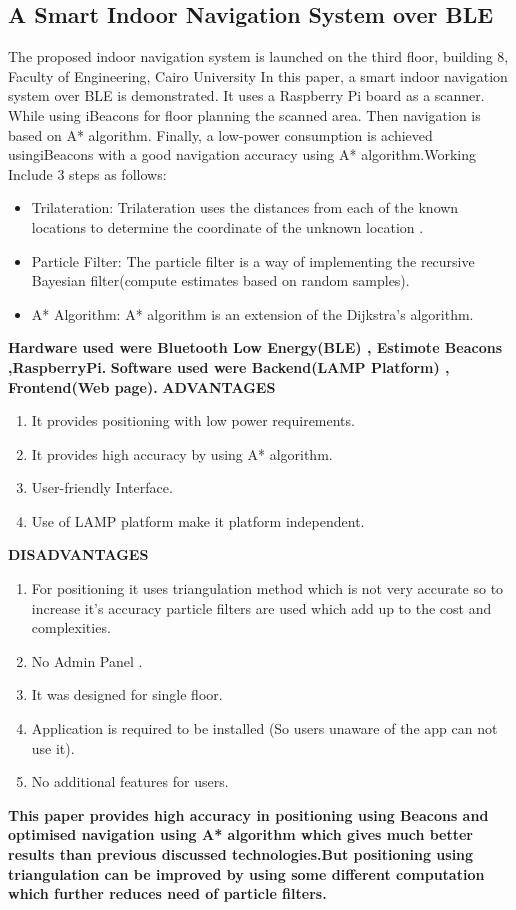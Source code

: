 ﻿\documentclass[a4paper, 12pt]{article}
\begin{document}
\subsection{A Smart Indoor Navigation System over BLE}
\hspace{1cm}  
The proposed indoor navigation system is launched on the third ﬂoor, building 8, Faculty of Engineering, Cairo University In this paper, a smart indoor navigation system over BLE is demonstrated. It uses a Raspberry Pi board as a scanner. While using iBeacons for ﬂoor planning the scanned area. Then navigation is based on A* algorithm. Finally, a low-power consumption is achieved usingiBeacons with a good navigation accuracy using A* algorithm.Working Include 3 steps as follows:
\begin{itemize}
	\item	Trilateration: Trilateration uses the distances from each of the known locations to determine the coordinate of the unknown location .
	\item Particle Filter: The particle ﬁlter is a way of implementing the recursive Bayesian ﬁlter(compute estimates based on random samples). 
	\item	A* Algorithm: A* algorithm is an extension of the Dijkstra’s algorithm.	
\end{itemize}
\textbf{Hardware used were Bluetooth Low Energy(BLE) , Estimote Beacons ,RaspberryPi.}
\linebreak
\textbf{Software used were Backend(LAMP Platform) , Frontend(Web page).}
\textbf{ADVANTAGES}
\begin{enumerate}
	\item	It provides positioning with low power requirements.
	\item	It provides high accuracy by using A* algorithm.
	\item	User-friendly Interface.
	\item  Use of LAMP platform make it platform independent.	
\end{enumerate}
\textbf{DISADVANTAGES}
\begin{enumerate}
	\item	For positioning it uses triangulation method which is not very accurate so to increase it’s accuracy particle filters are used which add up to the cost and complexities.
	\item	No Admin Panel .
	\item It was designed for single floor.
	\item Application is required to be installed (So users unaware of the app can not use it).
	\item	No additional features for users.		
\end{enumerate}
\textbf{This paper provides high accuracy in positioning using Beacons and optimised navigation using A* algorithm which gives much better results than previous discussed technologies.But positioning using triangulation can be improved by using some different computation which further reduces need of particle filters.}
\end{document}

